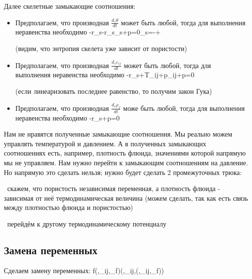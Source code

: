 \documentclass[main.tex]{subfiles}
\begin{document}
Далее скелетные замыкающие соотношения:

\begin{itemize}
\item Предполагаем, что производная $\displaystyle{}\frac{d_s\theta}{dt}$ может быть любой, тогда для выполнения неравенства необходимо 
\beq\label{FirstSkelet1}
-r_s-r_s\eta_s+p\frac{\partial\varphi}{\partial\theta}=0\Rightarrow\eta_s=-+\frac{\partial\varphi}{\partial\theta}
\eeq

(видим, что энтропия скелета уже зависит от пористости)

\item Предполагаем, что производная $\displaystyle{}\frac{d_s\varepsilon_{ij}}{dt}$ может быть любой, тогда для выполнения неравенства необходимо 
\beq\label{FirstSkelet2}
-r_s+T_{ij}+p\varphi\delta_{ij}+p=0
\eeq

(если линеаризовать последнее равенство, то получим закон Гука)

\item Предполагаем, что производная $\displaystyle{}\frac{d_s\rho_f}{dt}$ може быть любой, тогда для выполнения неравенства необходимо 
\beq\label{FirstSkelet3}
-r_s+p=0
\eeq
\end{itemize}

Нам не нравятся полученные замыкающие соотношения. Мы реально можем управлять температурой и давлением. А в полученных замыкающих соотношениях есть, например, плотность флюида, значениями которой напрямую мы не управляем. Нам нужно перейти к замыкающим соотношениям на давление. Но напрямую это сделать нельзя; нужно будет сделать 2 промежуточных трюка:

\textbullet\ скажем, что пористость независимая переменная, а плотность флюида - зависимая от неё термодинамическая величина (можем сделать, так как есть связь между плотностью флюида и пористостью)

\textbullet\ перейдём к другому термодинамическому потенциалу

\subsection{Замена переменных}

Сделаем замену переменных: 
\beq\label{ChangeVariables}
f\left(\theta,\varepsilon_{ij},\rho_f\right)\rightarrow {}\left(\theta,\varepsilon_{ij},\varphi(\theta,\varepsilon_{ij},\rho_f)\right)
\eeq
\end{document}

